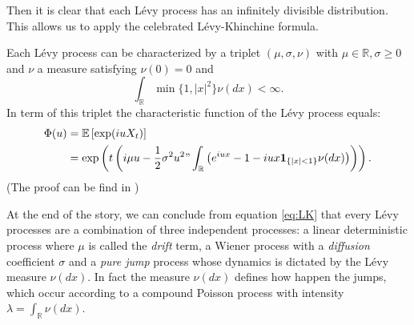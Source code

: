 Then it is clear that each L\'evy process has an infinitely divisible distribution. This allows us to apply the celebrated L\'evy-Khinchine formula. 

\begin{thm}
Each L\'evy process can be characterized by a triplet $(\mu,\sigma,\nu)$ with $\mu \in \mathbb{R},\sigma \geq 0$ and $\nu$ a measure satisfying $\nu(0) = 0$ and
$$\int_\mathbb{R} \min\{1,|x|^2\}\nu(dx)<\infty.$$
In term of this triplet the characteristic function of the L\'evy process equals:
\begin{align}\label{eq:LK}
\Phi(u) &= \mathbb{E}\left[\exp(i u X_t)\right]\nonumber\\
&= \exp\left(t\left(i\mu u -\frac{1}{2}\sigma^2u^2"\int_\mathbb{R}\left(e^{iux}-1-iux\mathbf{1}_{\{|x|<1\}}\nu(dx)\right)\right)\right).
\end{align}
(The proof can be find in \citeauthor{TC03} \citeyearpar{TC03})
\end{thm}

At the end of the story, we can conclude from equation \eqref{eq:LK} that every L\'evy processes are a combination of three independent processes: a linear deterministic process where $\mu$ is called the \textit{drift} term, a Wiener process with a \textit{diffusion} coefficient $\sigma$ and a \textit{pure jump} process whose dynamics is dictated by the L\'evy measure $\nu(dx)$. In fact the measure $\nu(dx)$ defines how happen the jumps, which occur according to a compound Poisson process with intensity $\lambda = \int_\mathbb{R}\nu(dx)$.

